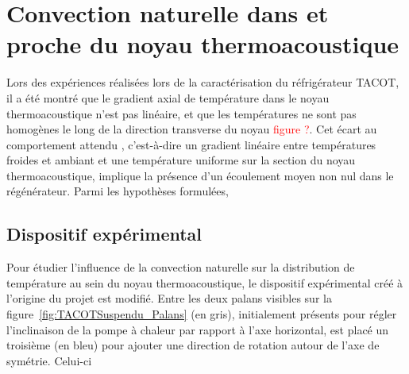 \chapter{Convection naturelle dans et proche du noyau thermoacoustique}

Lors des expériences réalisées lors de la caractérisation du réfrigérateur TACOT, il a été montré que le gradient axial de température dans le noyau thermoacoustique n'est pas linéaire, et que les températures ne sont pas homogènes le long de la direction transverse du noyau \textcolor{red}{figure ?}\cite{ramadan_design_2021}. Cet écart au comportement attendu , c'est-à-dire un gradient linéaire entre températures froides et ambiant et une température uniforme sur la section du noyau thermoacoustique, implique la présence d'un écoulement moyen non nul dans le régénérateur. Parmi les hypothèses formulées, 

\section{Dispositif expérimental}

Pour étudier l'influence de la convection naturelle sur la distribution de température au sein du noyau thermoacoustique, le dispositif expérimental créé à l'origine du projet est modifié. Entre les deux palans visibles sur la figure~\ref{fig:TACOTSuspendu_Palans} (en gris), initialement présents pour régler l'inclinaison de la pompe à chaleur par rapport à l'axe horizontal, est placé un troisième (en bleu) pour ajouter une direction de rotation autour de l'axe de symétrie. Celui-ci

